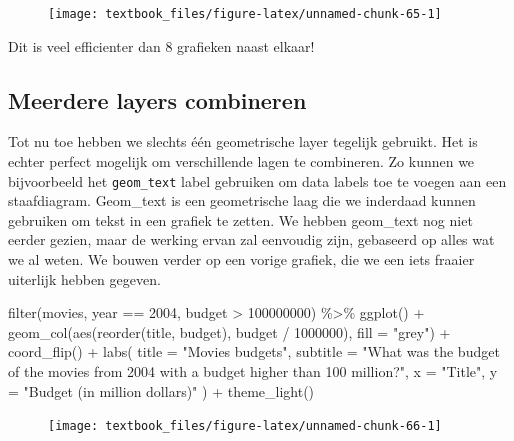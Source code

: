 \documentclass[]{tufte-book}
\newenvironment{Shaded}{}{}
\newcommand{\AttributeTok}[1]{\textcolor[rgb]{0.49,0.56,0.16}{#1}}
\newcommand{\DecValTok}[1]{\textcolor[rgb]{0.25,0.63,0.44}{#1}}
\newcommand{\FunctionTok}[1]{\textcolor[rgb]{0.02,0.16,0.49}{#1}}
\newcommand{\NormalTok}[1]{#1}
\newcommand{\SpecialCharTok}[1]{\textcolor[rgb]{0.25,0.44,0.63}{#1}}
\newcommand{\StringTok}[1]{\textcolor[rgb]{0.25,0.44,0.63}{#1}}
\begin{document}
\begin{figure}
\texttt{[image: textbook\_files/figure-latex/unnamed-chunk-65-1]} \end{figure}

Dit is veel efficienter dan 8 grafieken naast elkaar!

\hypertarget{meerdere-layers-combineren}{%
\subsection{Meerdere layers combineren}\label{meerdere-layers-combineren}}

Tot nu toe hebben we slechts één geometrische layer tegelijk gebruikt. Het is echter perfect mogelijk om verschillende lagen te combineren. Zo kunnen we bijvoorbeeld het \texttt{geom\_text} label gebruiken om data labels toe te voegen aan een staafdiagram. Geom\_text is een geometrische laag die we inderdaad kunnen gebruiken om tekst in een grafiek te zetten. We hebben geom\_text nog niet eerder gezien, maar de werking ervan zal eenvoudig zijn, gebaseerd op alles wat we al weten. We bouwen verder op een vorige grafiek, die we een iets fraaier uiterlijk hebben gegeven.

\begin{Shaded}
\begin{Highlighting}[]
\FunctionTok{filter}\NormalTok{(movies, year }\SpecialCharTok{==} \DecValTok{2004}\NormalTok{, budget }\SpecialCharTok{\textgreater{}} \DecValTok{100000000}\NormalTok{) }\SpecialCharTok{\%\textgreater{}\%}
  \FunctionTok{ggplot}\NormalTok{() }\SpecialCharTok{+}
  \FunctionTok{geom\_col}\NormalTok{(}\FunctionTok{aes}\NormalTok{(}\FunctionTok{reorder}\NormalTok{(title, budget), budget }\SpecialCharTok{/} \DecValTok{1000000}\NormalTok{), }\AttributeTok{fill =} \StringTok{"grey"}\NormalTok{) }\SpecialCharTok{+}
  \FunctionTok{coord\_flip}\NormalTok{() }\SpecialCharTok{+}
  \FunctionTok{labs}\NormalTok{(}
    \AttributeTok{title =} \StringTok{"Movies budgets"}\NormalTok{,}
    \AttributeTok{subtitle =} \StringTok{"What was the budget of the movies from 2004 with a budget higher than 100 million?"}\NormalTok{,}
    \AttributeTok{x =} \StringTok{"Title"}\NormalTok{,}
    \AttributeTok{y =} \StringTok{"Budget (in million dollars)"}
\NormalTok{  ) }\SpecialCharTok{+}
  \FunctionTok{theme\_light}\NormalTok{()}
\end{Highlighting}
\end{Shaded}

\begin{figure}
\texttt{[image: textbook\_files/figure-latex/unnamed-chunk-66-1]} \end{figure}
\end{document}
